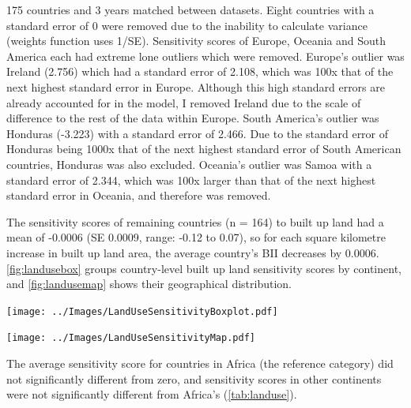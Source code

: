 \documentclass[11pt, a4paper, titlepage]{article}
\begin{document}
	175 countries and 3 years matched between datasets. Eight countries with a standard error of 0 were removed due to the inability to calculate variance (weights function uses 1/SE). Sensitivity scores of Europe, Oceania and South America each had extreme lone outliers which were removed. Europe's outlier was Ireland (2.756) which had a standard error of 2.108, which was 100x that of the next highest standard error in Europe. Although this high standard errors are already accounted for in the model, I removed Ireland due to the scale of difference to the rest of the data within Europe. South America's outlier was Honduras (-3.223) with a standard error of 2.466. Due to the standard error of Honduras being 1000x that of the next highest standard error of South American countries, Honduras was also excluded. Oceania's outlier was Samoa with a standard error of 2.344, which was 100x larger than that of the next highest standard error in Oceania, and therefore was removed.
	
	 The sensitivity scores of remaining countries (n = 164) to built up land had a mean of -0.0006 (SE 0.0009, range: -0.12 to 0.07), so for each square kilometre increase in built up land area, the average country's BII decreases by 0.0006. \autoref{fig:landusebox} groups  country-level built up land sensitivity scores by continent, and \autoref{fig:landusemap} shows their geographical distribution.
	
	\begin{center}
		
		\texttt{[image: ../Images/LandUseSensitivityBoxplot.pdf]}
		\label{fig:landusebox}
		
		\texttt{[image: ../Images/LandUseSensitivityMap.pdf]}
		\label{fig:landusemap}
		

    \end{center}

    The average sensitivity score for countries in Africa (the reference category) did not significantly different from zero, and sensitivity scores in other continents were not significantly different from Africa's (\autoref{tab:landuse}).
    
\end{document}
